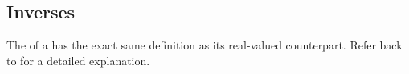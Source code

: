 \subsection{Inverses}\label{subsec:Complex_Matrix_Inverses}
The  of a  has the exact same definition as its real-valued counterpart.
Refer back to  for a detailed explanation.


